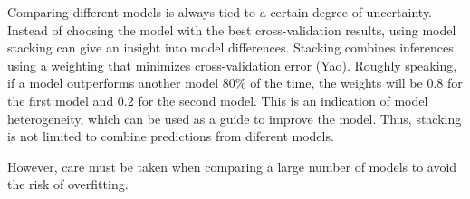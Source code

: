 Comparing different models is always tied to a certain degree of uncertainty.
Instead of choosing the model with the best cross-validation results, using model stacking can give an insight into model differences.
Stacking combines inferences using a weighting that minimizes cross-validation error (Yao).
Roughly speaking, if a model outperforms another model 80\% of the time, the weights will be 0.8 for the first model and 0.2 for the second model.
This is an indication of model heterogeneity, which can be used as a guide to improve the model.
Thus, stacking is not limited to combine predictions from diferent models.

However, care must be taken when comparing a large number of models to avoid the risk of overfitting.

